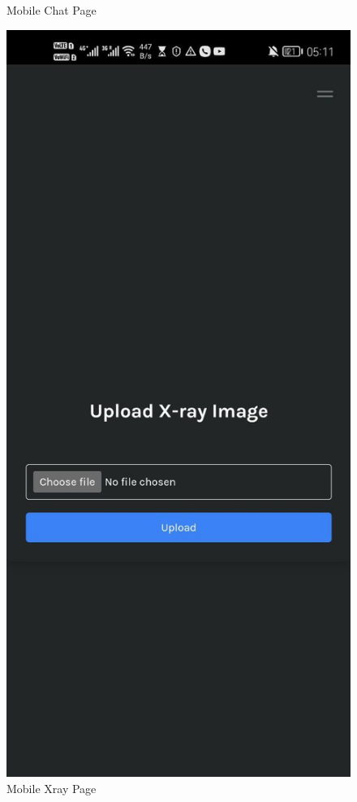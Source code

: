 \begin{figure}[htbp]
\begin{minipage}{0.3\textwidth}
        \caption{Mobile Chat Page}
        \label{fig:mobile-chat}
    \end{minipage}\hfill
    \begin{minipage}{0.3\textwidth}
        \centering
        \includegraphics[width=\textwidth]{./Figures/mobile-xray.jpg}
        \caption{Mobile Xray Page}
        \label{fig:mobile-xray}
    \end{minipage}
\end{figure}

